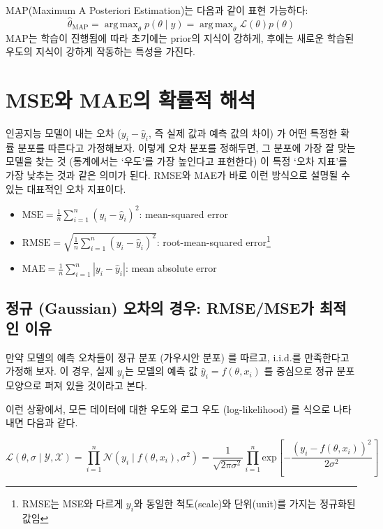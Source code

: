 \documentclass{article}
\DeclareMathOperator*{\argmax}{arg\,max}
\newcommand{\abs}[1]{\left|#1\right|}
\begin{document}
MAP(Maximum A Posteriori Estimation)는 다음과 같이 표현 가능하다:
\begin{equation}
  \hat{\theta}_{\text{MAP}} = \argmax_{\theta} p(\theta \mid y) = \argmax_{\theta} \mathcal{L}(\theta)p(\theta)
\end{equation}
MAP는 학습이 진행됨에 따라 초기에는 prior의 지식이 강하게, 후에는 새로운 학습된 우도의 지식이 강하게 작동하는 특성을 가진다.

\section{MSE와 MAE의 확률적 해석}
\label{sec:mse_mae}
인공지능 모델이 내는 오차 ($y_i-\hat{y}_i$, 즉 실제 값과 예측 값의 차이) 가 어떤 특정한 확률 분포를 따른다고 가정해보자. 이렇게 오차 분포를 정해두면, 그 분포에 가장 잘 맞는 모델을 찾는 것 (통계에서는 `우도'를 가장 높인다고 표현한다) 이 특정 `오차 지표'를 가장 낮추는 것과 같은 의미가 된다. RMSE와 MAE가 바로 이런 방식으로 설명될 수 있는 대표적인 오차 지표이다.

\begin{itemize}
  \item $\text{MSE} = \frac{1}{n}\sum_{i=1}^n\left(y_i-\hat{y}_i\right)^2$: mean-squared error
  \item $\text{RMSE} = \sqrt{\frac{1}{n}\sum_{i=1}^n\left(y_i-\hat{y}_i\right)^2}$:  root-mean-squared error\footnote{RMSE는 MSE와 다르게 $y_i$와 동일한 척도(scale)와 단위(unit)를 가지는 정규화된 값임}
  \item $\text{MAE} = \frac{1}{n}\sum_{i=1}^n\abs{y_i-\hat{y}_i}$: mean absolute error
\end{itemize}

\subsection{정규 (Gaussian) 오차의 경우: RMSE/MSE가 최적인 이유}
\label{subsec:gaussian}
만약 모델의 예측 오차들이 정규 분포 (가우시안 분포) 를 따르고, i.i.d.를 만족한다고 가정해 보자. 이 경우, 실제 $y_i$는 모델의 예측 값 $\hat{y}_i=f(\theta, x_i)$ 를 중심으로 정규 분포 모양으로 퍼져 있을 것이라고 본다.

이런 상황에서, 모든 데이터에 대한 우도와 로그 우도 (log-likelihood) 를 식으로 나타내면 다음과 같다.

\begin{equation}
  \mathcal{L}(\theta, \sigma \mid \mathcal{Y}, \mathcal{X}) = \prod_{i=1}^n \mathcal{N}(y_i \mid f(\theta, x_i), \sigma^2) = \frac{1}{\sqrt{2\pi\sigma^2}}\prod_{i=1}^n \text{exp}\left[-\frac{(y_i-f(\theta, x_i))^2}{2\sigma^2}\right]
\end{equation}
\end{document}
